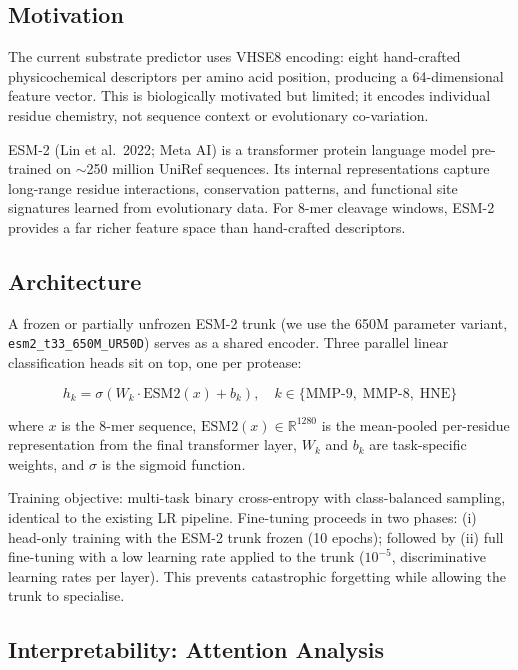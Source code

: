 \documentclass[10pt,a4paper]{article}
\newcommand{\seq}[1]{\texttt{#1}}
\begin{document}
\subsection{Motivation}

The current substrate predictor uses VHSE8 encoding: eight hand-crafted
physicochemical descriptors per amino acid position, producing a 64-dimensional
feature vector.  This is biologically motivated but limited; it encodes
individual residue chemistry, not sequence context or evolutionary co-variation.

ESM-2 (Lin et al.\ 2022; Meta AI) is a transformer protein language model
pre-trained on $\sim$250 million UniRef sequences.  Its internal representations
capture long-range residue interactions, conservation patterns, and functional
site signatures learned from evolutionary data.  For 8-mer cleavage windows,
ESM-2 provides a far richer feature space than hand-crafted descriptors.

\subsection{Architecture}

A frozen or partially unfrozen ESM-2 trunk (we use the 650M parameter variant,
\seq{esm2\_t33\_650M\_UR50D}) serves as a shared encoder.  Three parallel linear
classification heads sit on top, one per protease:

\begin{equation}
  h_k = \sigma\!\left(W_k \cdot \mathrm{ESM2}(x) + b_k\right),
  \quad k \in \{\text{MMP-9},\;\text{MMP-8},\;\text{HNE}\}
\end{equation}

where $x$ is the 8-mer sequence, $\mathrm{ESM2}(x) \in \mathbb{R}^{1280}$ is the
mean-pooled per-residue representation from the final transformer layer, $W_k$ and
$b_k$ are task-specific weights, and $\sigma$ is the sigmoid function.

Training objective: multi-task binary cross-entropy with class-balanced sampling,
identical to the existing LR pipeline.  Fine-tuning proceeds in two phases:
(i) head-only training with the ESM-2 trunk frozen (10 epochs); followed by
(ii) full fine-tuning with a low learning rate applied to the trunk
($10^{-5}$, discriminative learning rates per layer).  This prevents
catastrophic forgetting while allowing the trunk to specialise.

\subsection{Interpretability: Attention Analysis}
\end{document}
